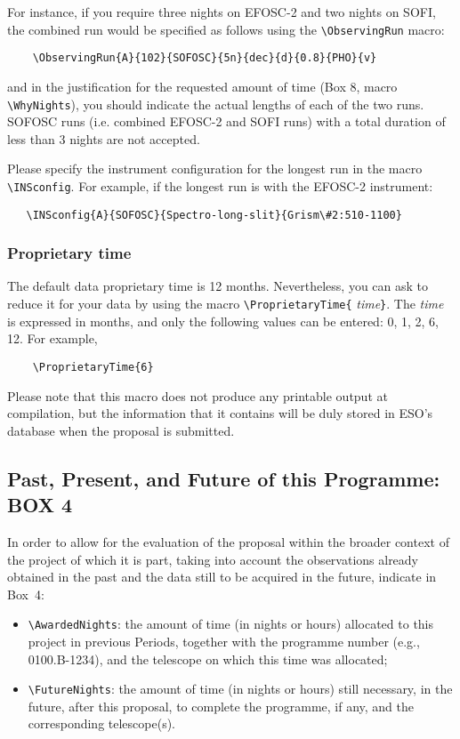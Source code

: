 \documentclass{article}
\begin{document}
For instance, if you require three nights on EFOSC-2 and two nights on SOFI, the
combined run would be specified as follows using the \verb|\ObservingRun| macro:
\begin{verbatim}
    \ObservingRun{A}{102}{SOFOSC}{5n}{dec}{d}{0.8}{PHO}{v}
\end{verbatim}

and in the justification for the requested amount of time
(Box 8, macro \verb|\WhyNights|), you should indicate the actual
lengths of each of the two runs. 
SOFOSC runs (i.e. combined EFOSC-2 and SOFI runs)  with a
total duration of less than 3 nights are not accepted.

Please specify the instrument configuration for the longest run
in the macro \verb|\INSconfig|. For example, if the longest run
is with the EFOSC-2 instrument:
\begin{verbatim}
   \INSconfig{A}{SOFOSC}{Spectro-long-slit}{Grism\#2:510-1100}
\end{verbatim}

\subsubsection*{Proprietary time} 
The default data proprietary time is 12 months.  Nevertheless, you can
ask to reduce it for 
your data by using the macro \verb|\ProprietaryTime{|{\it
    time\/}\verb|}|.  The {\it time\/} is expressed in months, and
only the following values can be entered:  0, 1, 2, 6, 12.  For
example, 
\begin{verbatim}
    \ProprietaryTime{6}
\end{verbatim}

Please note that this macro does not produce any printable output at
compilation, but the information that it contains will be duly stored
in ESO's database when the proposal is submitted.

\subsection{Past, Present, and Future of this Programme:  {\bf BOX 4}}

In order to allow for the evaluation of the proposal within the
broader context of the project of which it is part, taking into
account the observations already obtained in the past and the data
still to be acquired in the future, indicate in Box~4:
\begin{itemize}
\item \verb|\AwardedNights|: the amount of time (in nights or hours)
  allocated to this project in previous Periods, together with the
  programme number (e.g., 0100.B-1234), and the telescope
  on which this time was allocated;
\item \verb|\FutureNights|: the amount of time (in nights or hours)
  still necessary, in the future, after this proposal, to complete the
  programme, if any, and the corresponding telescope(s). 
\end{itemize}
\end{document}
